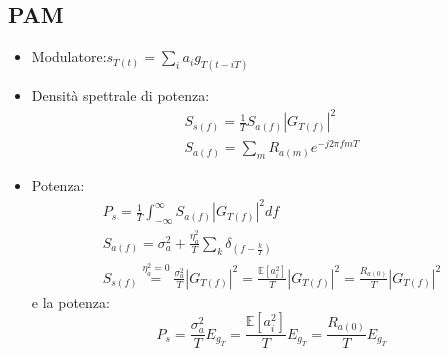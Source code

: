     \subsection{PAM}
        \begin{itemize}
            \item {Modulatore:$s_{T(t)} = \sum_{i}a_ig_{T(t-iT)}$}
            \item {Densità spettrale di potenza:
                \begin{gather}
                    S_{s(f)} = \frac{1}{T} S_{a(f)}\left|G_{T(f)}\right|^2 \nonumber \\
                    S_{a(f)} = \sum_{m} R_{a(m)}e^{-j2\pi fmT} \nonumber
                \end{gather}  
            }
            \item {Potenza:
                \begin{gather}
                    P_s = \frac{1}{T}\int_{-\infty}^{\infty}S_{a(f)} \left|G_{T(f)}\right|^2 df \nonumber\\
                    S_{a(f)} = \sigma_a^2 + \frac{\eta_a^2 }{T}\sum_{k} \delta_{(f-\frac{k}{T})} \nonumber \\
                    S_{s(f)} \overset{\eta_a^2 = 0}{=} \frac{\sigma_a^2}{T} \left|G_{T(f)}\right|^2 = \frac{\mathbb{E}[a_i^2]}{T} \left|G_{T(f)}\right|^2 = \frac{R_{a(0)}}{T} \left|G_{T(f)}\right|^2 \nonumber
                \end{gather}
                e la potenza:
                \[
                    P_s  = \frac{\sigma_a^2}{T} E_{g_T} = \frac{\mathbb{E}[a_i^2]}{T} E_{g_T} = \frac{R_{a(0)}}{T} E_{g_T}
                \]
            }
            

\end{itemize}
